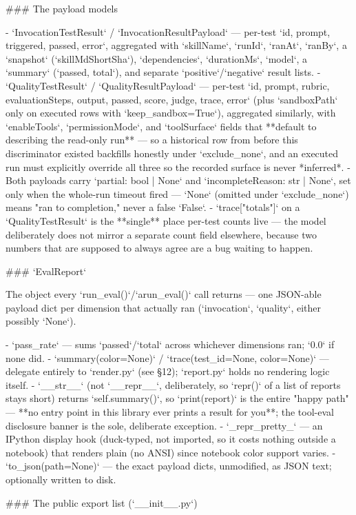 ### The payload models

- `InvocationTestResult` / `InvocationResultPayload` — per-test `{id, prompt, triggered, passed, error}`, aggregated with `skillName`, `runId`, `ranAt`, `ranBy`, a `snapshot` (`skillMdShortSha`), `dependencies`, `durationMs`, `model`, a `summary` (`{passed, total}`), and separate `positive`/`negative` result lists.
- `QualityTestResult` / `QualityResultPayload` — per-test `{id, prompt, rubric, evaluationSteps, output, passed, score, judge, trace, error}` (plus `sandboxPath` only on executed rows with `keep_sandbox=True`), aggregated similarly, with `enableTools`, `permissionMode`, and `toolSurface` fields that **default to describing the read-only run** — so a historical row from before this discriminator existed backfills honestly under `exclude_none`, and an executed run must explicitly override all three so the recorded surface is never *inferred*.
- Both payloads carry `partial: bool | None` and `incompleteReason: str | None`, set only when the whole-run timeout fired — `None` (omitted under `exclude_none`) means "ran to completion," never a false `False`.
- `trace["totals"]` on a `QualityTestResult` is the **single** place per-test counts live — the model deliberately does not mirror a separate count field elsewhere, because two numbers that are supposed to always agree are a bug waiting to happen.

### `EvalReport`

The object every `run_eval()`/`arun_eval()` call returns — one JSON-able payload dict per dimension that actually ran (`invocation`, `quality`, either possibly `None`).

- `pass_rate` — sums `passed`/`total` across whichever dimensions ran; `0.0` if none did.
- `summary(color=None)` / `trace(test_id=None, color=None)` — delegate entirely to `render.py` (see §12); `report.py` holds no rendering logic itself.
- `__str__` (not `__repr__`, deliberately, so `repr()` of a list of reports stays short) returns `self.summary()`, so `print(report)` is the entire "happy path" — **no entry point in this library ever prints a result for you**; the tool-eval disclosure banner is the sole, deliberate exception.
- `_repr_pretty_` — an IPython display hook (duck-typed, not imported, so it costs nothing outside a notebook) that renders plain (no ANSI) since notebook color support varies.
- `to_json(path=None)` — the exact payload dicts, unmodified, as JSON text; optionally written to disk.

### The public export list (`__init__.py`)

